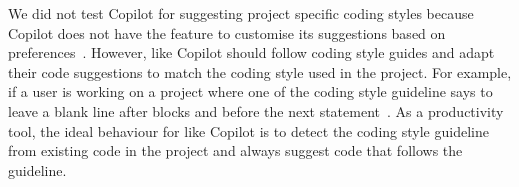 We did not test Copilot for suggesting project specific coding styles because Copilot does not have the feature to customise its suggestions based on preferences~\cite{Copilot-web}.
However, \cct{} like Copilot should follow coding style guides and adapt their code suggestions to match the coding style used in the project. 
For example, if a user is working on a project where one of the coding style guideline says to leave a blank line after blocks and before the next statement~\cite{airbnb_code}. As a productivity tool, the ideal behaviour for \cct{} like Copilot is to detect the coding style guideline from existing code in the project and always suggest code that follows the guideline. 




